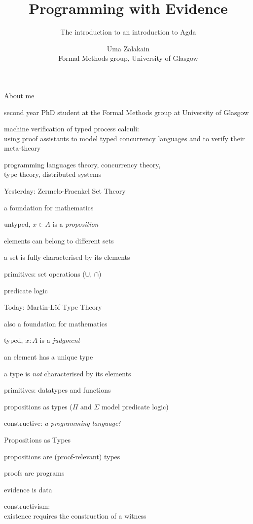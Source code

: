 \documentclass[dvipsnames]{beamer}
\title{Programming with Evidence}
\subtitle{\small The introduction to an introduction to Agda}
\author{Uma Zalakain\\\tiny Formal Methods group, University of Glasgow}
\date{}
\institute{Basque Center for Applied Mathematics\\\tiny November 23, 2021}
\newenvironment{wideitemize}{\itemize\addtolength{\itemsep}{1em}}{\enditemize}
\newcommand{\sitem}{\item[\raisebox{.45ex}{\rule{.6ex}{.6ex}}]}
\begin{document}
\maketitle

\begin{frame}{About me}
\begin{wideitemize}
  \sitem second year PhD student at the Formal Methods group at University of Glasgow
  \sitem machine verification of typed process calculi:\\
    using proof assistants to model typed concurrency languages and to verify their meta-theory
  \sitem programming languages theory, concurrency theory,\\
    type theory, distributed systems
\end{wideitemize}
\end{frame}

\begin{frame}{Yesterday: Zermelo-Fraenkel Set Theory}
\begin{wideitemize}
  \sitem a foundation for mathematics
  \sitem untyped, $x \in A$ is a \emph{proposition}
  \sitem elements can belong to different sets
  \sitem a set is fully characterised by its elements
  \sitem primitives: set operations ($\cup$, $\cap$)
  \sitem predicate logic
\end{wideitemize}
\end{frame}

\begin{frame}{Today: Martin-L\"of Type Theory}
\begin{wideitemize}
  \sitem also a foundation for mathematics
  \sitem typed, $x : A$ is a \emph{judgment}
  \sitem an element has a unique type
  \sitem  a type is \emph{not} characterised by its elements
  \sitem primitives: datatypes and functions
  \sitem propositions as types ($\Pi$ and $\Sigma$ model predicate logic)
  \sitem constructive: \emph{a programming language!}
\end{wideitemize}
\end{frame}

\begin{frame}{Propositions as Types}
\begin{wideitemize}
  \sitem propositions are (proof-relevant) types
  \sitem proofs are programs
  \sitem evidence is data
  \sitem constructivism: \\ existence requires the construction of a witness
\end{wideitemize}
\end{frame}
\end{document}
